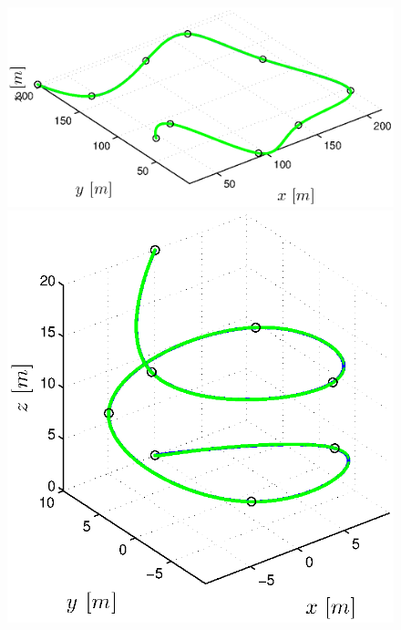 \begin{figure}[h]
  \begin{minipage}[t]{0.32\textwidth}
    \includegraphics[width = \textwidth]{trackings/figure_3D_road_SplineDegree3_trajectoryFollowing_Disturbance_0}
  \end{minipage}
  \hfill
  \begin{minipage}[t]{0.32\textwidth}
    \includegraphics[width = \textwidth]{trackings/figure_3D_helix_SplineDegree3_trajectoryFollowing_Disturbance_0}
  \end{minipage}
  \hfill
  \begin{minipage}[t]{0.32\textwidth}

\end{minipage}
\end{figure}
